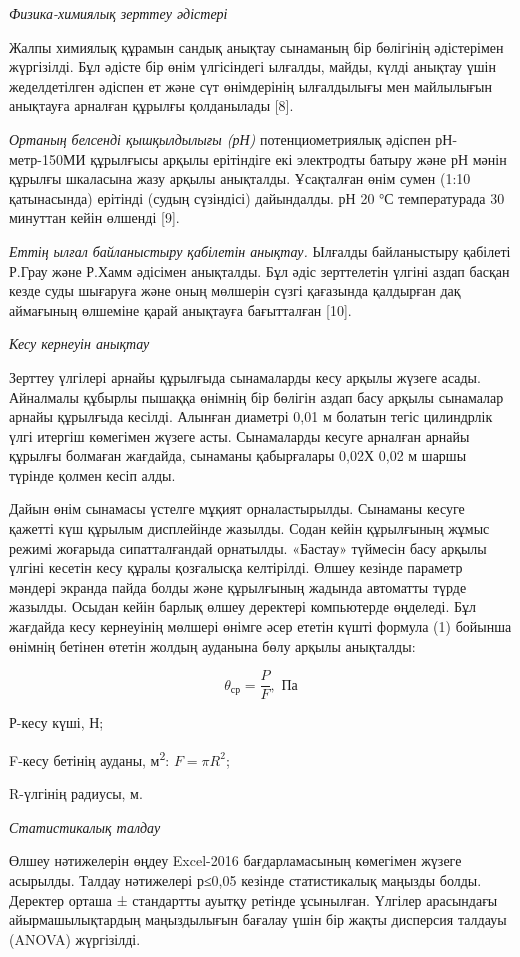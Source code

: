 \begin{multicols}{2}
\emph{Физика-химиялық зерттеу әдістері}

Жалпы химиялық құрамын сандық анықтау сынаманың бір бөлігінің
әдістерімен жүргізілді. Бұл әдісте бір өнім үлгісіндегі ылғалды, майды,
күлді анықтау үшін жеделдетілген әдіспен ет және сүт өнімдерінің
ылғалдылығы мен майлылығын анықтауға арналған құрылғы қолданылады
{[}8{]}.

\emph{Ортаның белсенді қышқылдылығы (рН)} потенциометриялық әдіспен
рН-метр-150МИ құрылғысы арқылы ерітіндіге екі электродты батыру және рН
мәнін құрылғы шкаласына жазу арқылы анықталды. Ұсақталған өнім сумен
(1:10 қатынасында) ерітінді (судың сүзіндісі) дайындалды. рН 20 °С
температурада 30 минуттан кейін өлшенді {[}9{]}.

\emph{Еттің ылғал байланыстыру қабілетін анықтау.} Ылғалды байланыстыру
қабілеті Р.Грау және Р.Хамм әдісімен анықталды. Бұл әдіс зерттелетін
үлгіні аздап басқан кезде суды шығаруға және оның мөлшерін сүзгі
қағазында қалдырған дақ аймағының өлшеміне қарай анықтауға бағытталған
{[}10{]}.

\emph{Кесу кернеуін анықтау}

Зерттеу үлгілері арнайы құрылғыда сынамаларды кесу арқылы жүзеге асады.
Айналмалы құбырлы пышаққа өнімнің бір бөлігін аздап басу арқылы
сынамалар арнайы құрылғыда кесілді. Алынған диаметрі 0,01 м болатын
тегіс цилиндрлік үлгі итергіш көмегімен жүзеге асты. Сынамаларды кесуге
арналған арнайы құрылғы болмаған жағдайда, сынаманы қабырғалары 0,02Х
0,02 м шаршы түрінде қолмен кесіп алды.

Дайын өнім сынамасы үстелге мұқият орналастырылды. Сынаманы кесуге
қажетті күш құрылым дисплейінде жазылды. Содан кейін құрылғының жұмыс
режимі жоғарыда сипатталғандай орнатылды. «Бастау» түймесін басу арқылы
үлгіні кесетін кесу құралы қозғалысқа келтірілді. Өлшеу кезінде параметр
мәндері экранда пайда болды және құрылғының жадында автоматты түрде
жазылды. Осыдан кейін барлық өлшеу деректері компьютерде өңделеді. Бұл
жағдайда кесу кернеуінің мөлшері өнімге әсер ететін күшті формула (1)
бойынша өнімнің бетінен өтетін жолдың ауданына бөлу арқылы анықталды:

\begin{equation}
\theta_{\text{ср}}=\frac{P}{F},\text{ Па}
\end{equation}

Р-кесу күші, Н;

F-кесу бетінің ауданы, м\textsuperscript{2}:
$F=\pi R^{2}$;

R-үлгінің радиусы, м.

\emph{Статистикалық талдау}

Өлшеу нәтижелерін өңдеу Excel-2016 бағдарламасының көмегімен жүзеге
асырылды. Талдау нәтижелері р≤0,05 кезінде статистикалық маңызды болды.
Деректер орташа ± стандартты ауытқу ретінде ұсынылған. Үлгілер
арасындағы айырмашылықтардың маңыздылығын бағалау үшін бір жақты
дисперсия талдауы (ANOVA) жүргізілді.
\end{multicols}

